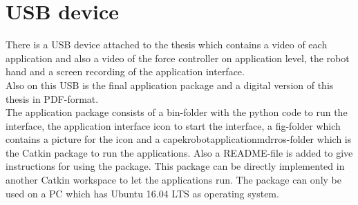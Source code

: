 \chapter{USB device}

There is a USB device attached to the thesis which contains a video of each application and also a video of the force controller on application level, the robot hand and a screen recording of the application interface.\\
Also on this USB is the final application package and a digital version of this thesis in PDF-format.\\
The application package consists of a bin-folder with the python code to run the interface, the application interface icon to start the interface, a fig-folder which contains a picture for the icon and a capek\textunderscore robot\textunderscore application\textunderscore mdr\textunderscore ros-folder which is the Catkin package to run the applications. Also a README-file is added to give instructions for using the package. This package can be directly implemented in another Catkin workspace to let the applications run. The package can only be used on a PC which has Ubuntu 16.04 LTS as operating system. 
